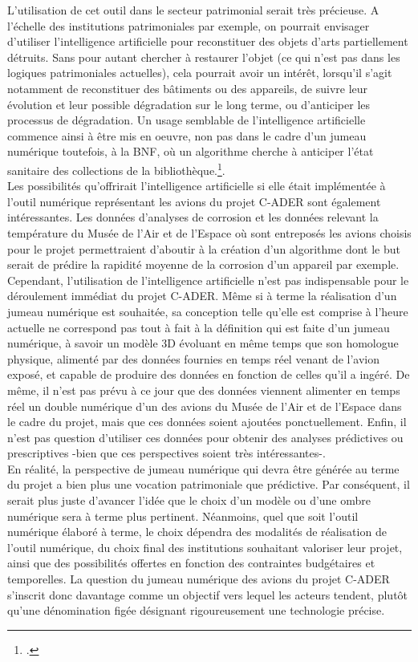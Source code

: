 L’utilisation de cet outil dans le secteur patrimonial serait très précieuse. A l’échelle des institutions patrimoniales par exemple, on pourrait envisager d’utiliser l’intelligence artificielle pour reconstituer des objets d’arts partiellement détruits. Sans pour autant chercher à restaurer l’objet (ce qui n’est pas dans les logiques patrimoniales actuelles), cela pourrait avoir un intérêt, lorsqu’il s’agit notamment de reconstituer des bâtiments ou des appareils, de suivre leur évolution et leur possible dégradation sur le long terme, ou d’anticiper les processus de dégradation. Un usage semblable de l’intelligence artificielle commence ainsi à être mis en oeuvre, non pas dans le cadre d’un jumeau numérique toutefois, à la BNF, où un algorithme cherche à anticiper l’état sanitaire des collections de la bibliothèque.\footcite{leroyterquemIntelligenceArtificielleAu}.\\

Les possibilités qu’offrirait l’intelligence artificielle si elle était implémentée à l’outil numérique représentant les avions du projet C-ADER sont également intéressantes. Les données d’analyses de corrosion et les données relevant la température du Musée de l’Air et de l’Espace où sont entreposés les avions choisis pour le projet permettraient d’aboutir à la création d’un algorithme dont le but serait de prédire la rapidité moyenne de la corrosion d’un appareil par exemple.\\ 

Cependant, l’utilisation de l'intelligence artificielle n'est pas indispensable pour le déroulement immédiat du projet C-ADER. Même si à terme la réalisation d’un jumeau numérique est souhaitée, sa conception telle qu'elle est comprise à l'heure actuelle ne correspond pas tout à fait à la définition qui est faite d’un jumeau numérique, à savoir un modèle 3D évoluant en même temps que son homologue physique, alimenté par des données fournies en temps réel venant de l'avion exposé, et capable de produire des données en fonction de celles qu'il a ingéré. De même, il n’est pas prévu à ce jour que des données viennent alimenter en temps réel un double numérique d’un des avions du Musée de l’Air et de l’Espace dans le cadre du projet, mais que ces données soient ajoutées ponctuellement. Enfin, il n’est pas question d’utiliser ces données pour obtenir des analyses prédictives ou prescriptives -bien que ces perspectives soient très intéressantes-.\\ 

En réalité, la perspective de jumeau numérique qui devra être générée au terme du projet a bien plus une vocation patrimoniale que prédictive. Par conséquent, il serait plus juste d’avancer l’idée que le choix d’un modèle ou d’une ombre numérique sera à terme plus pertinent. Néanmoins, quel que soit l’outil numérique élaboré à terme, le choix dépendra des modalités de réalisation de l'outil numérique, du choix final des institutions souhaitant valoriser leur projet, ainsi que des possibilités offertes en fonction des contraintes budgétaires et temporelles. La question du jumeau numérique des avions du projet C-ADER s’inscrit donc davantage comme un objectif vers lequel les acteurs tendent, plutôt qu’une dénomination figée désignant rigoureusement une technologie précise.

